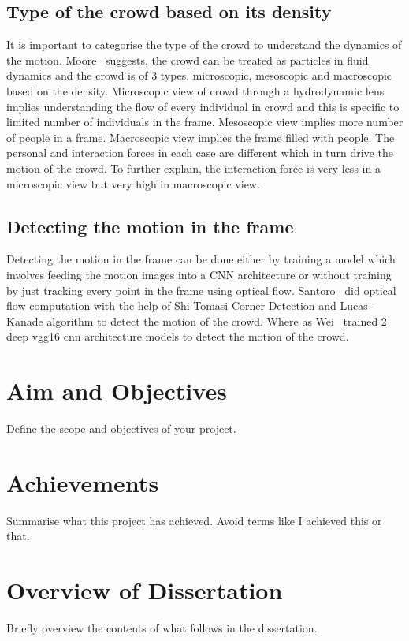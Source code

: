 \subsection{Type of the crowd based on its density}
It is important to categorise the type of the crowd to understand the dynamics of the motion. Moore~\cite{moore2011visual} suggests, the crowd can be treated as particles in fluid dynamics and the crowd is of 3 types, microscopic, mesoscopic and macroscopic based on the density. Microscopic view of crowd through a hydrodynamic lens implies understanding the flow of every individual in crowd and this is specific to limited number of individuals in the frame. Mesoscopic view implies more number of people in a frame. Macroscopic view implies the frame filled with people. The personal and interaction forces in each case are different which in turn drive the motion of the crowd. To further explain, the interaction force is very less in a microscopic view but very high in macroscopic view.
\subsection{Detecting the motion in the frame}
Detecting the motion in the frame can be done either by training a model which involves feeding the motion images into a CNN architecture or without training by just tracking every point in the frame using optical flow. Santoro~\cite{santoro2010crowd} did optical flow computation with the help of Shi-Tomasi Corner Detection and Lucas–Kanade algorithm to detect the motion of the crowd. Where as Wei~\cite{wei2020very} trained 2 deep vgg16 cnn architecture models to detect the motion of the crowd.


\section{Aim and Objectives} \label{sec:objectives}
Define the scope and objectives of your project.

\section{Achievements}
Summarise what this project has achieved. Avoid terms like I achieved this or 
that. 

\section{Overview of Dissertation}
Briefly overview the contents of what follows in the dissertation.